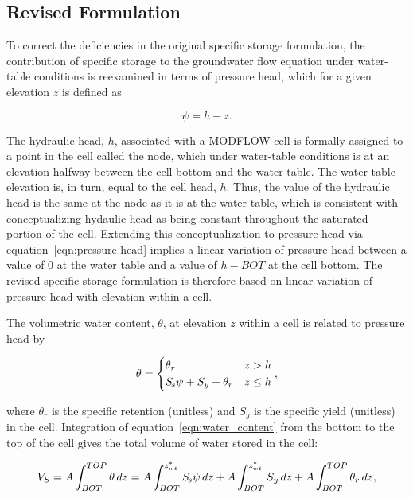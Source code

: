 \subsection{Revised Formulation}

To correct the deficiencies in the original specific storage formulation, the contribution of specific storage to the groundwater flow equation under water-table conditions is reexamined in terms of pressure head, which for a given elevation $z$ is defined as

\begin{equation}
	\label{eqn:pressure-head}
	\psi = h - z.
\end{equation}

\noindent The hydraulic head, $h$, associated with a MODFLOW cell is formally assigned to a point in the cell called the node, which under water-table conditions is at an elevation halfway between the cell bottom and the water table. The water-table elevation is, in turn, equal to the cell head, $h$. Thus, the value of the hydraulic head is the same at the node as it is at the water table, which is consistent with conceptualizing hydaulic head as being constant throughout the saturated portion of the cell. Extending this conceptualization to pressure head via equation~\ref{eqn:pressure-head} implies a linear variation of pressure head between a value of $0$ at the water table and a value of $h - BOT$ at the cell bottom. The revised specific storage formulation is therefore based on linear variation of pressure head with elevation within a cell.

The volumetric water content, $\theta$, at elevation $z$ within a cell is related to pressure head by

\begin{equation}
	\label{eqn:water_content}
	\begin{aligned}
		\theta = 
		\begin{dcases}
			\theta_r & z > h \\
			{S_{\kern -.1em s}} \psi + S_y + \theta_r  & z \leq h
		\end{dcases},
	\end{aligned}
\end{equation}

\noindent where $\theta_r$ is the specific retention (unitless) and $S_y$ is the specific yield (unitless) in the cell. Integration of equation~\ref{eqn:water_content} from the bottom to the top of the cell gives the total volume of water stored in the cell:

\begin{equation}
	\label{eqn:storage-total-integrated}
	V_S = A \int_{BOT}^{TOP} \theta \, dz = A \int_{BOT}^{{z_{wt}^*}} {S_{\kern -.1em s}} \psi \, dz + A \int_{BOT}^{{z_{wt}^*}} S_y \, dz + A \int_{BOT}^{TOP} \theta_r \, dz ,
\end{equation}

